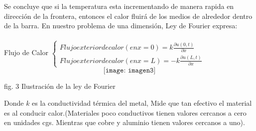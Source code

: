 \documentclass[10pt,a4paper]{report}
\begin{document}
Se concluye que si la temperatura esta incrementando de manera rapida en dirección de la frontera, entonces el calor fluirá de los medios de alrededor dentro de la barra. En nuestro problema de una dimensión, Ley de Fourier expresa:
\\\\ Flujo de Calor $
\left \{ \begin{matrix}
\displaystyle Flujo exterior de calor (en x = 0) = k \frac{\partial u (0,t)}{\partial x}
\\
\displaystyle Flujo exterior de calor (en x = L) = -k \frac{\partial u (L,t)}{\partial x} 
\end{matrix} \right. $
\\
$$\texttt{[image: imagen3]}$$
\begin{center}
\small{fig. 3 Ilustración de la ley de Fourier}
\end{center}
Donde $k$ es la conductividad térmica del metal, Mide que tan efectivo el material es al conducir calor.(Materiales poco conductivos tienen valores cercanos a cero en unidades cgs. Mientras que cobre y aluminio tienen valores cercanos a uno).
\\\\
 
\end{document}
